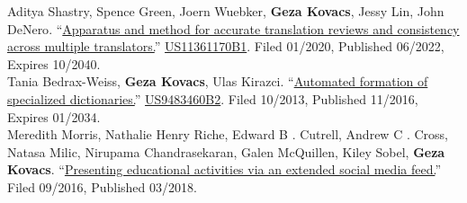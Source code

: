 
{\small Aditya Shastry, Spence Green, Joern Wuebker,} \textbf{Geza Kovacs}, {\small Jessy Lin, John DeNero}. ``\href{https://patents.google.com/patent/US11361170B1/en}{Apparatus and method for accurate translation reviews and consistency across multiple translators.}'' \hypersetup{urlcolor=black}\href{https://patents.google.com/patent/US11361170B1/en}{US11361170B1}\hypersetup{urlcolor=linkcol}. Filed 01/2020, Published 06/2022, Expires 10/2040.\\

{\small Tania Bedrax-Weiss,} \textbf{Geza Kovacs}, {\small Ulas Kirazci.} ``\href{https://patents.google.com/patent/US9483460B2}{Automated formation of specialized dictionaries.}'' \hypersetup{urlcolor=black}\href{https://patents.google.com/patent/US9483460B2}{US9483460B2}\hypersetup{urlcolor=linkcol}. Filed 10/2013, Published 11/2016, Expires 01/2034.\\

{\small Meredith Morris, Nathalie Henry Riche, Edward B . Cutrell, Andrew C . Cross, Natasa Milic, Nirupama Chandrasekaran, Galen McQuillen, Kiley Sobel,} \textbf{Geza Kovacs}. ``\href{https://patents.google.com/patent/US20180068578A1}{Presenting educational activities via an extended social media feed.}''  Filed 09/2016, Published 03/2018.\\ %